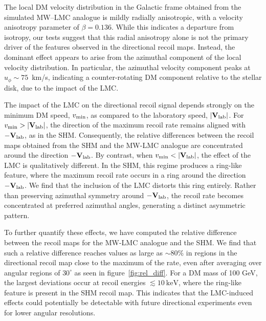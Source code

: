 \documentclass[a4paper,11pt]{article}
\begin{document}
The local DM velocity distribution in the Galactic frame obtained from the simulated MW--LMC analogue is mildly radially anisotropic, with a velocity anisotropy parameter of $\beta = 0.136$. While this indicates a departure from isotropy, our tests suggest that this radial anisotropy alone is not the primary driver of the features observed in the directional recoil maps. Instead, the dominant effect appears to arise from the azimuthal component of the local velocity distribution. In particular, the azimuthal velocity component peaks at
$u_\phi \sim  75$~km/s, indicating a counter-rotating DM component relative to the stellar disk, due to the impact of the LMC. 

The impact of the LMC on the directional recoil signal depends strongly on the minimum DM speed, $v_{\rm min}$, as compared to the laboratory speed, $|{\bf V}_{\rm lab}|$. For $v_{\rm min} > |{\bf V}_{\rm lab}|$, the direction of the maximum recoil rate remains aligned with $-{\bf V}_{\rm lab}$, as in the SHM. Consequently, the relative differences between the recoil maps obtained from the SHM and the MW-LMC analogue are concentrated around the direction $-{\bf V}_{\rm lab}$. By contrast, when $v_{\rm min} < |{\bf V}_{\rm lab}|$, the effect of the LMC is qualitatively different. In the SHM, this regime produces a ring-like feature, where the maximum recoil rate occurs in a ring around the direction $-{\bf V}_{\rm lab}$. We find that the inclusion of the LMC distorts this ring entirely. Rather than preserving azimuthal symmetry around $-{\bf V}_{\rm lab}$, the recoil rate becomes concentrated at preferred azimuthal angles, generating a distinct asymmetric pattern. 

To further quantify these effects, we have computed the relative difference between the recoil maps for the MW-LMC analogue and the SHM. We find that such a relative difference reaches values as large as $\sim 80\%$ in regions in the directional recoil map close to the maximum of the rate, even after averaging over angular regions of $30^\circ$ as seen in figure~\ref{fig:rel_diff}. For a DM mass of 100 GeV, the largest deviations occur at recoil energies $\lesssim 10~\mathrm{keV}$, where the ring-like feature is present in the SHM recoil map. This indicates that the LMC-induced effects could potentially be detectable 
with future directional experiments even for lower angular resolutions.
\end{document}
